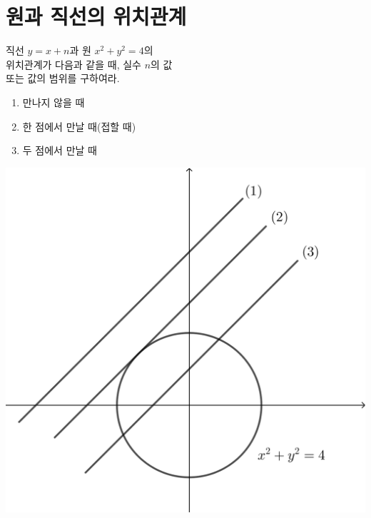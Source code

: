 \documentclass{oblivoir}
\begin{document}
\section{원과 직선의 위치관계}\label{circleline}
\noindent
\begin{minipage}{0.55\textwidth}
%
\exam{}\label{circleline1}
직선 \(y=x+n\)과 원 \(x^2+y^2=4\)의\\
위치관계가 다음과 같을 때, 실수 \(n\)의 값\\
또는 값의 범위를 구하여라.
\begin{enumerate}
\item
만나지 않을 때
\item
한 점에서 만날 때(접할 때)
\item
두 점에서 만날 때
\end{enumerate}
\par\medskip
\end{minipage}
\begin{minipage}{0.4\textwidth}
\includegraphics[width=\textwidth]{circleline_1}
\end{minipage}
\end{document}
